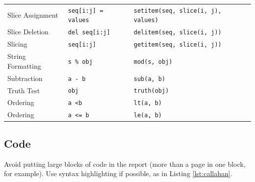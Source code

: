 \documentclass{l4proj}
\begin{document}
\begin{table}[]
\begin{tabular}{@{}lll@{}}
    Slice Assignment      & \texttt{seq{[}i:j{]} = values}          & \texttt{setitem(seq, slice(i, j), values)}            \\
    Slice Deletion        & \texttt{del seq{[}i:j{]}}               & \texttt{delitem(seq, slice(i, j))}                    \\
    Slicing               & \texttt{seq{[}i:j{]}}                   & \texttt{getitem(seq, slice(i, j))}                    \\
    String Formatting     & \texttt{s \% obj}                       & \texttt{mod(s, obj)}                                  \\
    Subtraction           & \texttt{a - b}                          & \texttt{sub(a, b)}                                    \\
    Truth Test            & \texttt{obj}                            & \texttt{truth(obj)}                                   \\
    Ordering              & \texttt{a \textless b}                  & \texttt{lt(a, b)}                                     \\
    Ordering              & \texttt{a \textless{}= b}               & \texttt{le(a, b)}                                     \\
    \end{tabular}
    \end{table}
\subsection{Code}

Avoid putting large blocks of code in the report (more than a page in one block, for example). Use syntax highlighting if possible, as in Listing \ref{lst:callahan}.
\end{document}
